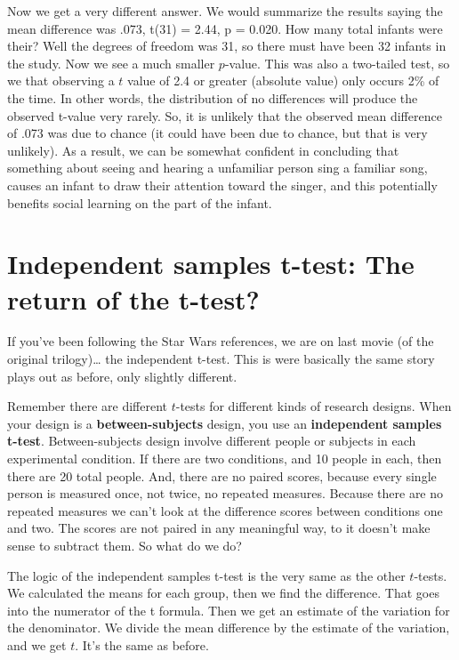 \documentclass[]{book}
\begin{document}
Now we get a very different answer. We would summarize the results saying the mean difference was .073, t(31) = 2.44, p = 0.020. How many total infants were their? Well the degrees of freedom was 31, so there must have been 32 infants in the study. Now we see a much smaller \(p\)-value. This was also a two-tailed test, so we that observing a \(t\) value of 2.4 or greater (absolute value) only occurs 2\% of the time. In other words, the distribution of no differences will produce the observed t-value very rarely. So, it is unlikely that the observed mean difference of .073 was due to chance (it could have been due to chance, but that is very unlikely). As a result, we can be somewhat confident in concluding that something about seeing and hearing a unfamiliar person sing a familiar song, causes an infant to draw their attention toward the singer, and this potentially benefits social learning on the part of the infant.

\hypertarget{independent-samples-t-test-the-return-of-the-t-test}{%
\section{Independent samples t-test: The return of the t-test?}\label{independent-samples-t-test-the-return-of-the-t-test}}

If you've been following the Star Wars references, we are on last movie (of the original trilogy)\ldots{} the independent t-test. This is were basically the same story plays out as before, only slightly different.

Remember there are different \(t\)-tests for different kinds of research designs. When your design is a \textbf{between-subjects} design, you use an \textbf{independent samples t-test}. Between-subjects design involve different people or subjects in each experimental condition. If there are two conditions, and 10 people in each, then there are 20 total people. And, there are no paired scores, because every single person is measured once, not twice, no repeated measures. Because there are no repeated measures we can't look at the difference scores between conditions one and two. The scores are not paired in any meaningful way, to it doesn't make sense to subtract them. So what do we do?

The logic of the independent samples t-test is the very same as the other \(t\)-tests. We calculated the means for each group, then we find the difference. That goes into the numerator of the t formula. Then we get an estimate of the variation for the denominator. We divide the mean difference by the estimate of the variation, and we get \(t\). It's the same as before.
\end{document}
